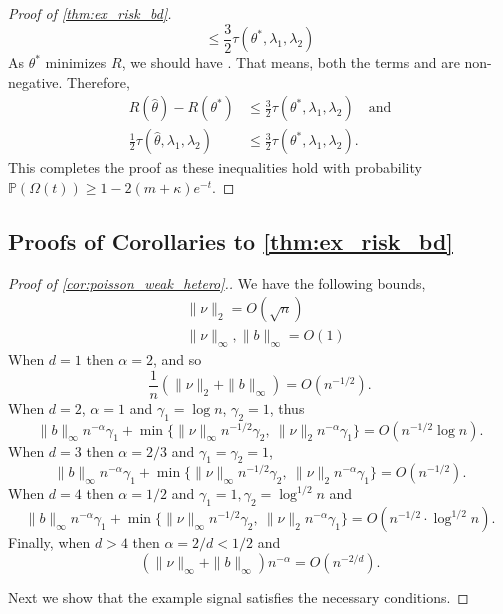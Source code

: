 \documentclass[ejs,noshowframe]{imsart}
\theoremstyle{plain}
\theoremstyle{definition}
\renewcommand{\P}{\mathbb{P}}
\renewcommand{\hat}{\widehat}
\begin{document}
\begin{appendix}
\begin{proof}[Proof of \autoref{thm:ex_risk_bd}]
\begin{equation}
\leq 
\frac{3}{2}\tau(\theta^*,\lambda_1, \lambda_2)
\end{equation}
As $\theta^*$ minimizes $R$, we should have 
\smash{$R(\hat\theta) \geq R(\theta^*)$}. 
That means, both  the terms \smash{$R(\hat\theta) - R(\theta^*)$} and 
\smash{$\frac{1}{2}\tau(\hat\theta, \lambda_1, \lambda_2)$} are non-negative. 
Therefore, 
\begin{align}
R(\hat\theta) - R(\theta^*) &\leq \frac{3}{2}\tau(\theta^*,\lambda_1,  
\lambda_2) \quad \text{and}\\
\frac{1}{2} \tau(\hat\theta, \lambda_1, \lambda_2) &\leq \frac{3}{2} 
\tau(\theta^*,\lambda_1, \lambda_2).
\end{align}
This completes the proof as these inequalities hold with probability 
$\P(\Omega(t)) \geq 1 - 2(m+\kappa) e^{-t}.$
\end{proof}


\subsection{Proofs of Corollaries to \autoref{thm:ex_risk_bd}}
\label{sec:proof_mle_bound_coro}
\begin{proof}[Proof of \autoref{cor:poisson_weak_hetero}.]
	
	We have the following bounds,
	\begin{align}
		&\| \nu \|_2 = O(\sqrt n)\\
		&\| \nu \|_\infty, \|b \|_\infty = O(1)
	\end{align}
	When $d=1$ then $\alpha = 2$, and so
	\[
	\frac 1n (\|\nu\|_2 + \|b\|_\infty) = O(n^{-1/2}).
	\]
	When $d = 2$, $\alpha = 1$ and $\gamma_1 = \log n$, $\gamma_2 = 1$, thus
	\[
	\| b \|_\infty  n^{-\alpha} \gamma_1 + \min\{ \| \nu \|_\infty n^{-1/2} 
	\gamma_2,\ \| \nu \|_2 n^{-\alpha} \gamma_1\} = O(n^{-1/2} \log n).
	\]
	When $d=3$ then $\alpha = 2/3$ and $\gamma_1 = \gamma_2 = 1$,
	\[
	\| b \|_\infty  n^{-\alpha} \gamma_1 + \min\{ \| \nu \|_\infty n^{-1/2} 
	\gamma_2,\ \| \nu \|_2 n^{-\alpha} \gamma_1\} = O(n^{-1/2}).
	\]
	When $d = 4$ then $\alpha = 1/2$ and $\gamma_1 = 1, \gamma_2 = \log^{1/2} n$ 
	and 
	\[
	\| b \|_\infty  n^{-\alpha} \gamma_1 + \min\{ \| \nu \|_\infty n^{-1/2} 
	\gamma_2,\ \| \nu \|_2 n^{-\alpha} \gamma_1\} = O(n^{-1/2} \cdot \log^{1/2} 
	n).
	\]
	Finally, when $d > 4$ then $\alpha = 2/d < 1/2$ and
	\[
	(\|\nu \|_\infty + \|b\|_\infty) n^{-\alpha} = O(n^{-2/d}).
	\]

	Next we show that the example signal satisfies the necessary conditions.


\end{proof}
\end{appendix}
\end{document}
